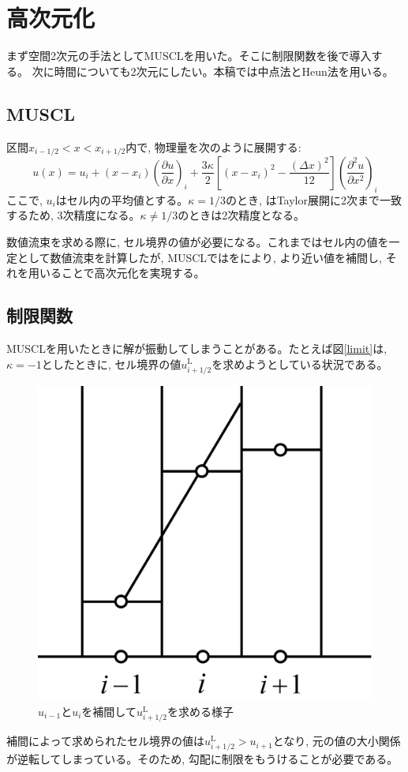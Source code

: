 \documentclass[dvipdfmx,b5paper]{jsarticle}
\begin{document}
\section{高次元化}
まず空間2次元の手法としてMUSCLを用いた。そこに制限関数を後で導入する。
次に時間についても2次元にしたい。本稿では中点法とHeun法を用いる。
\subsection{MUSCL}
区間$x_{i-1/2}<x<x_{i+1/2}$内で, 物理量を次のように展開する: 
\begin{equation}
  u(x)=u_i+(x-x_i)\left(\frac{\partial u}{\partial x}\right)_{i}+\frac{3\kappa}{2}\left[(x-x_i)^2-\frac{(\Delta x)^2}{12}\right]\left(\frac{\partial^2 u}{\partial x^2}\right)_{i}
  \label{muscl}
\end{equation}
ここで, $u_i$はセル内の平均値とする。$\kappa=1/3$のとき, はTaylor展開に2次まで一致するため, 3次精度になる。$\kappa\neq1/3$のときは2次精度となる。

数値流束を求める際に, セル境界の値が必要になる。これまではセル内の値を一定として数値流束を計算したが, MUSCLではをにより, より近い値を補間し, それを用いることで高次元化を実現する。

\subsection{制限関数}
MUSCLを用いたときに解が振動してしまうことがある。たとえば図\ref{limit}は, $\kappa=-1$としたときに, セル境界の値$u_{i+1/2}^{\mathrm{L}}$を求めようとしている状況である。

\begin{figure}[H]
  \centering
  \includegraphics[width = 0.4\linewidth]{fig/limit.png}
  \caption{$u_{i-1}$と$u_i$を補間して$u_{i+1/2}^{\mathrm{L}}$を求める様子}
  \label{fig:limit}
\end{figure}

補間によって求められたセル境界の値は$u_{i+1/2}^{\mathrm{L}}>u_{i+1}$となり, 元の値の大小関係が逆転してしまっている。そのため, 勾配に制限をもうけることが必要である。
\end{document}
